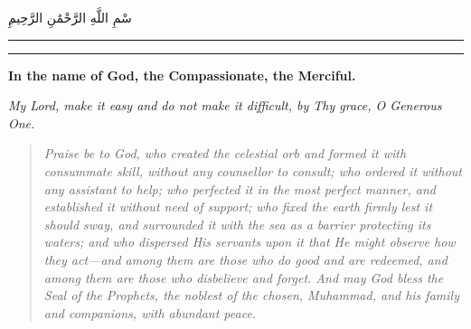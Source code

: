 \documentclass[11pt,a4paper]{article}
\newcommand{\longline}{\noindent\rule{\textwidth}{0.4pt}}
\newcommand{\arlarge}[1]{{\Large\arabicfont\RL{#1}}}
\begin{document}
\begin{center}
{\arlarge بِسْمِ اللَّهِ الرَّحْمَٰنِ الرَّحِيمِ}
\end{center}

\bigskip

{\arabicfont{}}

\bigskip
\longline
\bigskip

\bigskip

{\small\arabicfont
{}}

\bigskip

\begin{center}
\rule{0.6\textwidth}{0.4pt}
\end{center}

\bigskip

\textbf{In the name of God, the Compassionate, the Merciful.}

\textit{My Lord, make it easy and do not make it difficult, by Thy grace, O Generous One.}

\begin{quote}
\small
\textit{Praise be to God, who created the celestial orb and formed it with consummate skill, without any counsellor to consult; who ordered it without any assistant to help; who perfected it in the most perfect manner, and established it without need of support; who fixed the earth firmly lest it should sway, and surrounded it with the sea as a barrier protecting its waters; and who dispersed His servants upon it that He might observe how they act---and among them are those who do good and are redeemed, and among them are those who disbelieve and forget. And may God bless the Seal of the Prophets, the noblest of the chosen, Muhammad, and his family and companions, with abundant peace.}
\end{quote}

\vspace{0.5cm}
\end{document}
